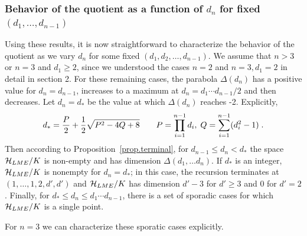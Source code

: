 \documentclass[12pt]{article}
\theoremstyle{definition}
\begin{document}
\subsubsection*{Behavior of the quotient as a function of $d_n$ for fixed $(d_1, \dots, d_{n-1})$}

Using these results, it is now straightforward to characterize the behavior of the quotient as we vary $d_n$ for some fixed $(d_1,d_2,\dots,d_{n-1})$. We assume that $n > 3$ or $n=3$ and $d_1 \ge 2$, since we understood the cases $n=2$ and $n=3, d_1=2$ in detail in section 2. For these remaining cases, the parabola $\Delta(d_n)$ has a positive value for $d_n = d_{n-1}$, increases to a maximum at $d_n = d_1 \cdots d_{n-1}/2$ and then decreases. Let $d_n = d_*$ be the value at which $\Delta(d_n)$ reaches -2. Explicitly,
\[
d_* = {P \over 2} + {1 \over 2}\sqrt{P^2 - 4 Q + 8} \qquad  P = \prod_{i=1}^{n-1} d_i,\;  Q = \sum_{i=1}^{n-1} (d_i^2 - 1) \; .
\]
Then according to Proposition~\ref{prop.terminal}, for $d_{n-1} \le d_n < d_*$ the space ${\cal H}_{LME}/K$ is non-empty and has dimension $\Delta(d_1, \dots d_n)$.  If $d_*$ is an integer, ${\cal H}_{LME}/K$ is nonempty for $d_n= d_*$; in this case, the recursion terminates at $(1,\dots,1,2,d',d')$ and ${\cal H}_{LME}/K$ has dimension $d'-3$ for $d' \ge 3$ and $0$ for $d' = 2$. Finally, for $d_* \le d_n \le d_1 \cdots d_{n-1}$, there is a set of sporadic cases for which ${\cal H}_{LME}/K$ is a single point.

For $n=3$ we can characterize these sporatic cases explicitly.
\end{document}

